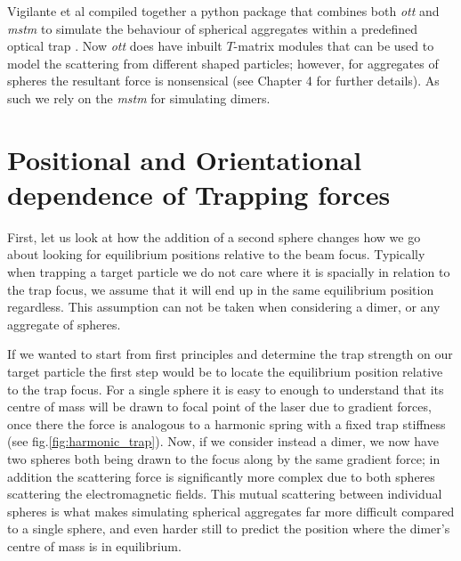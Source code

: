 Vigilante et al compiled together a python package that combines 
both \textit{ott} and \textit{mstm} to simulate the behaviour of 
spherical aggregates within a predefined optical trap 
\cite{Vigilante2020}. Now \textit{ott} does have inbuilt $T$-matrix 
modules that can be used to model the scattering from different 
shaped particles; however, for aggregates of spheres the resultant 
force is nonsensical (see Chapter 4 for further details). As such 
we rely on the \textit{mstm} for simulating dimers.  

\section{Positional and Orientational dependence of Trapping forces}
\label{sec:eq_positions}
First, let us look at how the addition of a second sphere
changes how we go about looking for equilibrium positions
relative to the beam focus. Typically when trapping a target
particle we do not care where it is spacially in relation 
to the trap focus, we assume that it will end up in the same 
equilibrium position regardless. This assumption can not 
be taken when considering a dimer, or any aggregate of spheres.  

If we wanted to start from first principles and determine 
the trap strength on our target particle the first step 
would be to locate the equilibrium position relative to 
the trap focus. For a single sphere it is easy to enough 
to understand that its centre of mass will be drawn to 
focal point of the laser due to gradient forces, once there 
the force is analogous to a harmonic spring with a fixed 
trap stiffness (see fig.\ref{fig:harmonic_trap}). Now, if 
we consider instead a dimer, we now have two spheres both 
being drawn to the focus along by the same gradient force; 
in addition the scattering force is significantly more complex 
due to both spheres scattering the electromagnetic fields. 
This mutual scattering between individual spheres is what 
makes simulating spherical aggregates far more difficult 
compared to a single sphere, and even harder still to 
predict the position where the dimer's centre of mass is 
in equilibrium.

